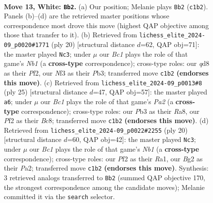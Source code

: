\documentclass[11pt]{article}
\begin{document}
\clearpage

\begin{figure}[p]\centering
\begin{subfigure}{0.46\textwidth}\centering
\resizebox{\linewidth}{!}{%
\newchessgame
\chessboard[
  setfen={2bq1rk1/1p3p1p/r1n2np1/p1bp4/P7/1P2PNP1/5PBP/RNBQ1RK1 w - - 0 13},
  showmover=false,
  pgfstyle=straightmove, color=movearrow, markmove={c1-b2}
]}
\caption{}
\end{subfigure}\hfill
\begin{subfigure}{0.46\textwidth}\centering
\resizebox{\linewidth}{!}{%
\newchessgame
\chessboard[
  setfen={r1bqr1k1/pp3ppp/2n2n2/2bp4/8/1P2PN2/PB2BPPP/RN1Q1RK1 w - - 2 11},
  showmover=false,
  pgfstyle=straightmove, color=movearrow, markmove={b1-c3}
]}
\caption{}
\end{subfigure}
\\[4pt]
\begin{subfigure}{0.46\textwidth}\centering
\resizebox{\linewidth}{!}{%
\newchessgame
\chessboard[
  setfen={r1b2rk1/pp1nqpb1/2p1p1pp/8/1PBP4/1QN1PN2/P4PPP/2R2RK1 b - - 2 13},
  showmover=false,
  pgfstyle=straightmove, color=movearrow, markmove={a7-a6}
]}
\caption{}
\end{subfigure}\hfill
\begin{subfigure}{0.46\textwidth}\centering
\resizebox{\linewidth}{!}{%
\newchessgame
\chessboard[
  setfen={r2q1rk1/pp3ppp/2n2n2/2bp4/6b1/1P2PN2/PB2BPPP/RN1Q1RK1 w - - 0 11},
  showmover=false,
  pgfstyle=straightmove, color=movearrow, markmove={b1-c3}
]}
\caption{}
\end{subfigure}
\caption{\textbf{Move 13, White: \texttt{Bb2}.} (a) Our position; Melanie plays \texttt{Bb2} (\texttt{c1b2}). Panels (b)--(d) are the retrieved master positions whose correspondence most drove this move (highest QAP objective among those that transfer to it). (b) Retrieved from \texttt{lichess\_elite\_2024-09\_p0020\#1771} (ply 20) [structural distance $d$=62, QAP obj=71]: the master played \texttt{Nc3}; under $\mu$ our \emph{Bc1} plays the role of that game's \emph{Nb1} (a \textbf{cross-type} correspondence); cross-type roles: our \emph{q}d8 as their \emph{P}f2, our \emph{N}f3 as their \emph{P}b3; transferred move \texttt{c1b2} \textbf{(endorses this move)}. (c) Retrieved from \texttt{lichess\_elite\_2024-09\_p0013\#8} (ply 25) [structural distance $d$=47, QAP obj=57]: the master played \texttt{a6}; under $\mu$ our \emph{Bc1} plays the role of that game's \emph{Pa2} (a \textbf{cross-type} correspondence); cross-type roles: our \emph{P}b3 as their \emph{R}a8, our \emph{P}f2 as their \emph{B}c8; transferred move \texttt{c1b2} \textbf{(endorses this move)}. (d) Retrieved from \texttt{lichess\_elite\_2024-09\_p0022\#2255} (ply 20) [structural distance $d$=60, QAP obj=42]: the master played \texttt{Nc3}; under $\mu$ our \emph{Bc1} plays the role of that game's \emph{Nb1} (a \textbf{cross-type} correspondence); cross-type roles: our \emph{P}f2 as their \emph{R}a1, our \emph{B}g2 as their \emph{P}a2; transferred move \texttt{c1b2} \textbf{(endorses this move)}. Synthesis: 3 retrieved analogs transferred to \texttt{Bb2} (summed QAP objective 170, the strongest correspondence among the candidate moves); Melanie committed it via the \texttt{search} selector.}

\end{figure}
\end{document}
